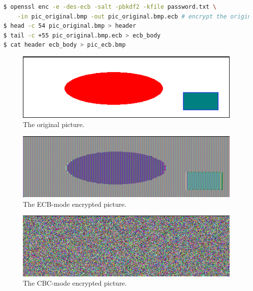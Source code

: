 \begin{lstlisting}[language=Bash, caption=Commands generating
    {\fontfamily{qcr}\selectfont pic\_ecb.bmp}, label={lst:pic_ecb}]
$ openssl enc -e -des-ecb -salt -pbkdf2 -kfile password.txt \
    -in pic_original.bmp -out pic_original.bmp.ecb # encrypt the original picture
$ head -c 54 pic_original.bmp > header
$ tail -c +55 pic_original.bmp.ecb > ecb_body
$ cat header ecb_body > pic_ecb.bmp
\end{lstlisting}

\begin{figure}
    \centering
    \includegraphics[height=\textheight,width=\textwidth,keepaspectratio]
    {figures/pic_original.png}
    \caption{The original picture.}\label{fig:original_pic}
\end{figure}

\begin{figure}
    \centering
    \includegraphics[height=\textheight,width=\textwidth,keepaspectratio]
    {figures/pic_ecb.png}
    \caption{The ECB-mode encrypted picture.}\label{fig:ecb_pic}
\end{figure}

\begin{figure}
    \centering
    \includegraphics[height=\textheight,width=\textwidth,keepaspectratio]
    {figures/pic_cbc.png}
    \caption{The CBC-mode encrypted picture.}\label{fig:cbc_pic}
\end{figure}

